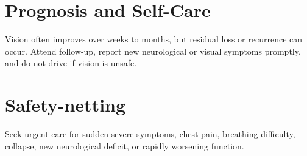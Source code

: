 \section*{Prognosis and Self-Care}
Vision often improves over weeks to months, but residual loss or recurrence can occur. Attend follow-up, report new neurological or visual symptoms promptly, and do not drive if vision is unsafe.
\section*{Safety-netting}
Seek urgent care for sudden severe symptoms, chest pain, breathing difficulty, collapse, new neurological deficit, or rapidly worsening function.
